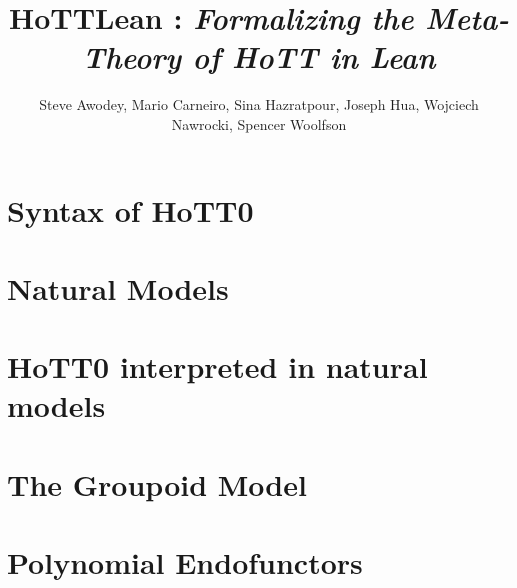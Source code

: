 
\title{HoTTLean : { \it Formalizing the Meta-Theory of HoTT in Lean} }
\author{Steve Awodey, Mario Carneiro, Sina Hazratpour, Joseph Hua,
  Wojciech Nawrocki, Spencer Woolfson}


\maketitle

\chapter{Syntax of HoTT0}

\chapter{Natural Models}

\chapter{HoTT0 interpreted in natural models}

\chapter{The Groupoid Model}

\chapter{Polynomial Endofunctors}


{}



